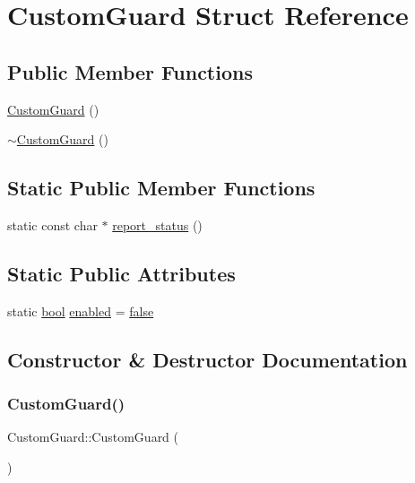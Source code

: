 \hypertarget{struct_custom_guard}{}\section{Custom\+Guard Struct Reference}
\label{struct_custom_guard}
\subsection*{Public Member Functions}
\begin{DoxyCompactItemize}
\item 
\mbox{\hyperlink{struct_custom_guard_a107e5fa36deed23dc8c82a015a01882f}{Custom\+Guard}} ()
\item 
\mbox{\hyperlink{struct_custom_guard_a2028de7d9d97016bc574532f3f3decac}{$\sim$\+Custom\+Guard}} ()
\end{DoxyCompactItemize}
\subsection*{Static Public Member Functions}
\begin{DoxyCompactItemize}
\item 
static const char $\ast$ \mbox{\hyperlink{struct_custom_guard_a72c42a4c096fe8dd486b41fac5b71f79}{report\+\_\+status}} ()
\end{DoxyCompactItemize}
\subsection*{Static Public Attributes}
\begin{DoxyCompactItemize}
\item 
static \mbox{\hyperlink{asdl_8h_af6a258d8f3ee5206d682d799316314b1}{bool}} \mbox{\hyperlink{struct_custom_guard_a5841df8ac0a6f19736b423adce7a9405}{enabled}} = \mbox{\hyperlink{asdl_8h_af6a258d8f3ee5206d682d799316314b1ae9de385ef6fe9bf3360d1038396b884c}{false}}
\end{DoxyCompactItemize}


\subsection{Constructor \& Destructor Documentation}
\mbox{\label{struct_custom_guard_a107e5fa36deed23dc8c82a015a01882f}} 
\subsubsection{\texorpdfstring{CustomGuard()}{CustomGuard()}}
{\footnotesize\ttfamily Custom\+Guard\+::\+Custom\+Guard (\begin{DoxyParamCaption}{ }\end{DoxyParamCaption})\hspace{0.3cm}{\ttfamily [inline]}}

